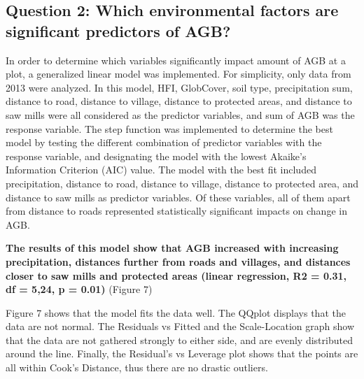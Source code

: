\documentclass[12pt,]{article}
\begin{document}
\hypertarget{question-2-which-environmental-factors-are-significant-predictors-of-agb}{%
\subsection{Question 2: Which environmental factors are significant
predictors of
AGB?}\label{question-2-which-environmental-factors-are-significant-predictors-of-agb}}

In order to determine which variables significantly impact amount of AGB
at a plot, a generalized linear model was implemented. For simplicity,
only data from 2013 were analyzed. In this model, HFI, GlobCover, soil
type, precipitation sum, distance to road, distance to village, distance
to protected areas, and distance to saw mills were all considered as the
predictor variables, and sum of AGB was the response variable. The step
function was implemented to determine the best model by testing the
different combination of predictor variables with the response variable,
and designating the model with the lowest Akaike's Information Criterion
(AIC) value. The model with the best fit included precipitation,
distance to road, distance to village, distance to protected area, and
distance to saw mills as predictor variables. Of these variables, all of
them apart from distance to roads represented statistically significant
impacts on change in AGB.

\textbf{The results of this model show that AGB increased with
increasing precipitation, distances further from roads and villages, and
distances closer to saw mills and protected areas (linear regression, R2
= 0.31, df = 5,24, p = 0.01)} (Figure 7)

\newpage

Figure 7 shows that the model fits the data well. The QQplot displays
that the data are not normal. The Residuals vs Fitted and the
Scale-Location graph show that the data are not gathered strongly to
either side, and are evenly distributed around the line. Finally, the
Residual's vs Leverage plot shows that the points are all within Cook's
Distance, thus there are no drastic outliers.
\end{document}
